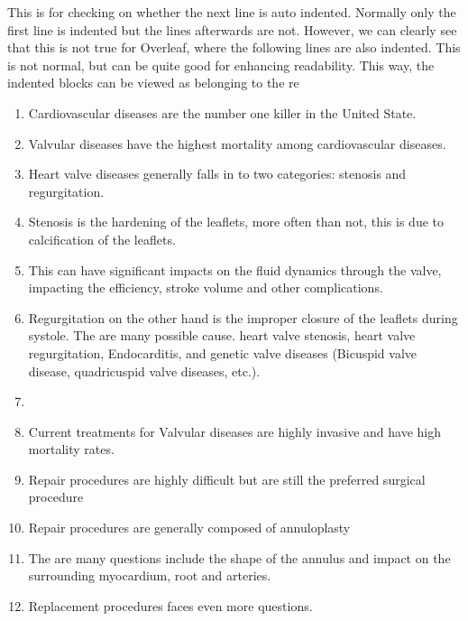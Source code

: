     This is for checking on whether the next line is auto indented. Normally only the first line is indented but the lines afterwards are not. However, we can clearly see that this is not true for Overleaf, where the following lines are also indented. This is not normal, but can be quite good for enhancing readability. This way, the indented blocks can be viewed as belonging to the re
\begin{enumerate}
\item Cardiovascular diseases are the number one killer in the United State. 
\item Valvular diseases have the highest mortality among cardiovascular diseases. 
\item Heart valve diseases generally falls in to two categories: stenosis and regurgitation. 
\item Stenosis is the hardening of the leaflets, more often than not, this is due to calcification of the leaflets. 
\item This can have significant impacts on the fluid dynamics through the valve, impacting the efficiency, stroke volume and other complications. 
\item Regurgitation on the other hand is the improper closure of the leaflets during systole. The are many possible cause. heart valve stenosis, heart valve regurgitation, Endocarditis, and genetic valve diseases (Bicuspid valve disease, quadricuspid valve diseases, etc.). 
\item 
\item Current treatments for Valvular diseases are highly invasive and have high mortality rates. 
\item Repair procedures are highly difficult but are still the preferred surgical procedure
\item Repair procedures are generally composed of annuloplasty 
\item The are many questions include the shape of the annulus and impact on the surrounding myocardium, root and arteries. 
\item Replacement procedures faces even more questions.




\end{enumerate}